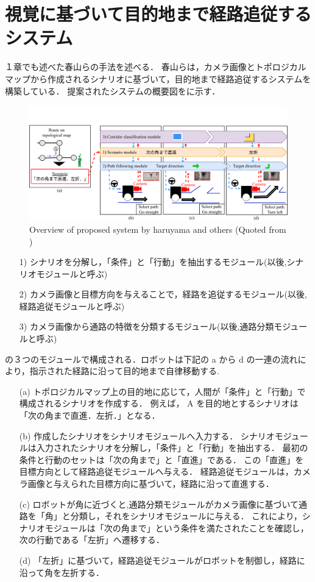 \section{視覚に基づいて目的地まで経路追従するシステム}
１章でも述べた春山らの手法を述べる．
春山らは，カメラ画像とトポロジカルマップから作成されるシナリオに基づいて，目的地まで経路追従するシステムを構築している．
提案されたシステムの概要図をに示す．

\begin{figure}[htbp]
  \centering
   \includegraphics[width=130mm]{images/pdf/haruyama/system.pdf}
   \caption[Overview of proposed system by haruyama and others]{Overview of proposed system by haruyama and others (Quoted from \cite{haruyama2023})}
   \label{fig:sys}
\end{figure}

\begin{enumerate}
  \item [1)]シナリオを分解し，「条件」と「行動」を抽出するモジュール(以後,シナリオモジュールと呼ぶ)
  \item [2)]カメラ画像と目標方向を与えることで，経路を追従するモジュール(以後,経路追従モジュールと呼ぶ)
  \item [3)]カメラ画像から通路の特徴を分類するモジュール(以後,通路分類モジュールと呼ぶ)
\end{enumerate}

の３つのモジュールで構成される．ロボットは下記の a から d の一連の流れにより，指示された経路に沿って目的地まで自律移動する.
\begin{enumerate}
  \item [(a)] 
  トポロジカルマップ上の目的地に応じて，人間が「条件」と「行動」で構成されるシナリオを作成する．
  例えば， A を目的地とするシナリオは「次の角まで直進．左折．」となる．
  \item [(b)] 
  作成したシナリオをシナリオモジュールへ入力する．
  シナリオモジュールは入力されたシナリオを分解し，「条件」と「行動」を抽出する．
  最初の条件と行動のセットは「次の角まで」と「直進」である．
  この「直進」を目標方向として経路追従モジュールへ与える．
  経路追従モジュールは，カメラ画像と与えられた目標方向に基づいて，経路に沿って直進する．
  \item [(c)] 
  ロボットが角に近づくと,通路分類モジュールがカメラ画像に基づいて通路を「角」と分類し，それをシナリオモジュールに与える．
  これにより，シナリオモジュールは「次の角まで」という条件を満たされたことを確認し，次の行動である「左折」へ遷移する．
  \item [(d)]
  「左折」に基づいて，経路追従モジュールがロボットを制御し，経路に沿って角を左折する．
\end{enumerate}

